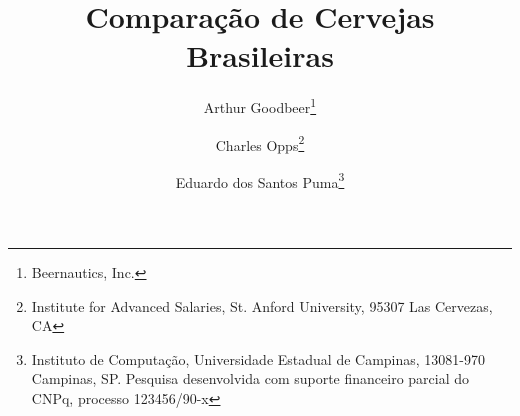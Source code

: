 \documentclass[11pt,twoside]{article}
\begin{document}
% 

%



\TRMakeCover


%
\pagestyle{myheadings}

%
\title{Comparação de Cervejas Brasileiras}

\author{Arthur Goodbeer\thanks{Beernautics, Inc.} \and
Charles Opps\thanks{Institute for Advanced Salaries, 
St. Anford University, 95307 Las Cervezas, CA} \and
Eduardo dos Santos Puma\thanks{Instituto  de Computação, Universidade
Estadual  de Campinas, 13081-970  Campinas,  SP.  Pesquisa desenvolvida com
suporte financeiro parcial do CNPq, processo 123456/90-x}}

\date{}

\maketitle

\end{document}
